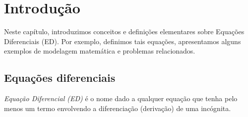 
\chapter{Introdução}\label{cap_intro}

Neste capítulo, introduzimos conceitos e definições elementares sobre Equações Diferenciais (ED). Por exemplo, definimos tais equações, apresentamos alguns exemplos de modelagem matemática e problemas relacionados.

\section{Equações diferenciais}\label{cap_intro_sec_ed}


\emph{Equação Diferencial (ED)} é o nome dado a qualquer equação que tenha pelo menos um termo envolvendo a diferenciação (derivação) de uma incógnita.

